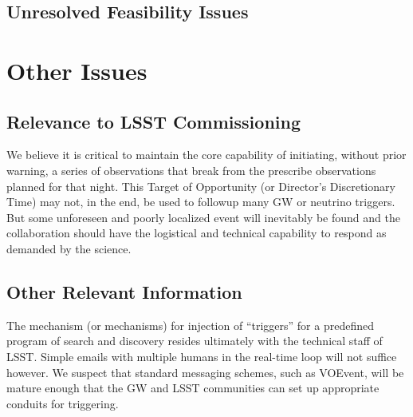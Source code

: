 \documentclass [11pt]{article}
\begin{document}
\subsection{Unresolved Feasibility Issues}



\section{Other Issues}


\subsection{Relevance to LSST Commissioning}

We believe it is critical to maintain the core capability of initiating, without prior warning, a series of observations that break from the prescribe observations planned for that night. This Target of Opportunity (or Director's Discretionary Time) may not, in the end, be used to followup many GW or neutrino triggers. But some unforeseen and poorly localized event will inevitably be found and the collaboration should have the logistical and technical capability to respond as demanded by the science.

\subsection{Other Relevant Information}

The mechanism (or mechanisms) for injection of ``triggers'' for a predefined program of search and discovery resides ultimately with the technical staff of LSST. Simple emails with multiple humans in the real-time loop will not suffice however. We suspect that standard messaging schemes, such as VOEvent, will be mature enough that the GW and LSST communities can set up appropriate conduits for triggering.

\end{document}
